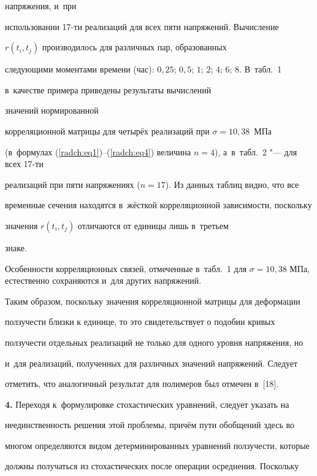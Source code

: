 \noindent напряжения, и~при 

использовании 17-ти реализаций для всех пяти напряжений. Вычисление 

$r( t_i ,t_j)$ производилось для различных пар, образованных 

следующими моментами времени (час): $0,25$; $0,5$; $1$; $2$; $4$; $6$; $8$. В~табл.~1 

в~качестве примера приведены результаты вычислений 

значений нормированной 

корреляционной матрицы для четырёх реализаций при $\sigma = 10{,}38$~МПа 

(в~формулах (\ref{radch:eq1})--(\ref{radch:eq4}) величина $n = 4$), а~в~табл.~2 "--- для всех 17-ти 

реализаций при пяти напряжениях ($n = 17$). Из данных таблиц видно, что все 

временные сечения находятся в~жёсткой корреляционной зависимости, поскольку 

значения $r( t_i ,t_j )$ отличаются от единицы лишь в~третьем 

знаке.





Особенности корреляционных связей, отмеченные в~табл.~1 для $\sigma = 

10{,}38$ МПа, естественно сохраняются и~для других напряжений.



Таким образом, поскольку значения корреляционной матрицы для деформации 

ползучести близки к единице, то это свидетельствует о подобии кривых 

ползучести отдельных реализаций не только для одного уровня напряжения, но 

и~для реализаций, полученных для различных значений напряжений. Следует 

отметить, что аналогичный результат для полимеров был отмечен в~[18].





\textbf{4.} Переходя к~формулировке стохастических уравнений, следует указать на 

неединственность решения этой проблемы, причём пути обобщений здесь во 

многом определяются видом детерминированных уравнений ползучести, которые 

должны получаться из стохастических после операции осреднения. Поскольку 

